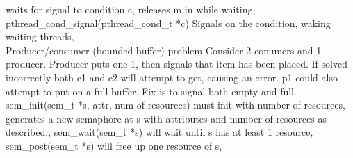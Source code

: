 \documentclass[3pt]{article}
\begin{document}
waits for signal to condition c, releases m in while waiting,
pthread\_cond\_signal(pthread\_cond\_t *c)
Signals on the condition, waking waiting threads,
\\
Producer/consumer (bounded buffer) problem
Consider 2 conumers and 1 producer. Producer puts one 1, then signals that item has been placed. If solved incorrectly both c1 and c2 will attempt to get, causing an error. p1 could also attempt to put on a full buffer.
Fix is to signal both empty and full.
\\
sem\_init(sem\_t *s, attr, num of resources)
must init with number of resources, generates a new semaphore at s with attributes and number of resources as described.,
sem\_wait(sem\_t *s)
will wait until s has at least 1 resource,
sem\_post(sem\_t *s)
will free up one resource of s,
\end{document}
